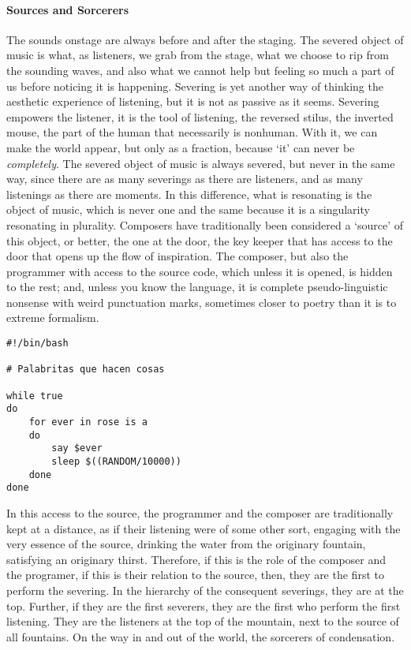\paragraph{Sources and Sorcerers}
The sounds onstage are always before and after the staging. The severed object of music is what, as listeners, we grab from the stage, what we choose to rip from the sounding waves, and also what we cannot help but feeling so much a part of us before noticing it is happening. Severing is yet another way of thinking the aesthetic experience of listening, but it is not as passive as it seems. Severing empowers the listener, it is the tool of listening, the reversed stilus, the inverted mouse, the part of the human that necessarily is nonhuman. With it, we can make the world appear, but only as a fraction, because `it' can never be \textit{completely}. The severed object of music is always severed, but never in the same way, since there are as many severings as there are listeners, and as many listenings as there are moments. In this difference, what is resonating is the object of music, which is never one and the same because it is a singularity resonating in plurality. Composers have traditionally been considered a `source' of this object, or better, the one at the door, the key keeper that has access to the door that opens up the flow of inspiration. The composer, but also the programmer with access to the source code, which unless it is opened, is hidden to the rest; and, unless you know the language, it is complete pseudo-linguistic nonsense with weird punctuation marks, sometimes closer to poetry than it is to extreme formalism. 

\begin{flushleft}
\small
\lstset{language=bash,mathescape=false}
\begin{lstlisting}[caption={Little words doing things},captionpos=b]
#!/bin/bash

# Palabritas que hacen cosas

while true
do
	for ever in rose is a
	do 
		say $ever
		sleep $((RANDOM/10000))
	done
done

\end{lstlisting}
\end{flushleft}

In this access to the source, the programmer and the composer are traditionally kept at a distance, as if their listening were of some other sort, engaging with the very essence of the source, drinking the water from the originary fountain, satisfying an originary thirst. Therefore, if this is the role of the composer and the programer, if this is their relation to the source, then, they are the first to perform the severing. In the hierarchy of the consequent severings, they are at the top. Further, if they are the first severers, they are the first who perform the first listening. They are the listeners at the top of the mountain, next to the source of all fountains. On the way in and out of the world, the sorcerers of condensation.

